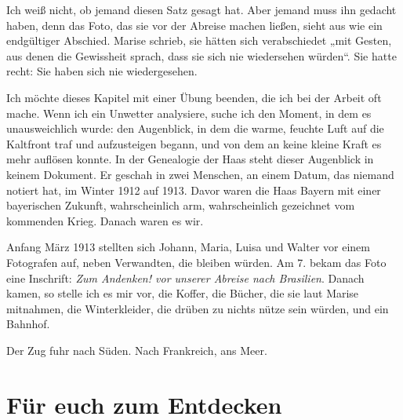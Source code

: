 \documentclass[
  ngerman,
  11pt,
  openany]{book}
\begin{document}
Ich weiß nicht, ob jemand diesen Satz gesagt hat. Aber jemand muss ihn
gedacht haben, denn das Foto, das sie vor der Abreise machen ließen,
sieht aus wie ein endgültiger Abschied. Marise schrieb, sie hätten sich
verabschiedet „mit Gesten, aus denen die Gewissheit sprach, dass sie
sich nie wiedersehen würden``. Sie hatte recht: Sie haben sich nie
wiedergesehen.

Ich möchte dieses Kapitel mit einer Übung beenden, die ich bei der
Arbeit oft mache. Wenn ich ein Unwetter analysiere, suche ich den
Moment, in dem es unausweichlich wurde: den Augenblick, in dem die
warme, feuchte Luft auf die Kaltfront traf und aufzusteigen begann, und
von dem an keine kleine Kraft es mehr auflösen konnte. In der Genealogie
der Haas steht dieser Augenblick in keinem Dokument. Er geschah in zwei
Menschen, an einem Datum, das niemand notiert hat, im Winter 1912 auf
1913. Davor waren die Haas Bayern mit einer bayerischen Zukunft,
wahrscheinlich arm, wahrscheinlich gezeichnet vom kommenden Krieg.
Danach waren es wir.

Anfang März 1913 stellten sich Johann, Maria, Luisa und Walter vor einem
Fotografen auf, neben Verwandten, die bleiben würden. Am 7. bekam das
Foto eine Inschrift: \emph{Zum Andenken! vor unserer Abreise nach
Brasilien}. Danach kamen, so stelle ich es mir vor, die Koffer, die
Bücher, die sie laut Marise mitnahmen, die Winterkleider, die drüben zu
nichts nütze sein würden, und ein Bahnhof.

Der Zug fuhr nach Süden. Nach Frankreich, ans Meer.

\section{Für euch zum Entdecken}\label{fuxfcr-euch-zum-entdecken-3}
\end{document}
